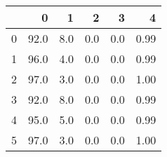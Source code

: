 \begin{tabular}{lrrrrr}
\toprule
{} &     0 &    1 &    2 &    3 &     4 \\
\midrule
0 &  92.0 &  8.0 &  0.0 &  0.0 &  0.99 \\
1 &  96.0 &  4.0 &  0.0 &  0.0 &  0.99 \\
2 &  97.0 &  3.0 &  0.0 &  0.0 &  1.00 \\
3 &  92.0 &  8.0 &  0.0 &  0.0 &  0.99 \\
4 &  95.0 &  5.0 &  0.0 &  0.0 &  0.99 \\
5 &  97.0 &  3.0 &  0.0 &  0.0 &  1.00 \\
\bottomrule
\end{tabular}
